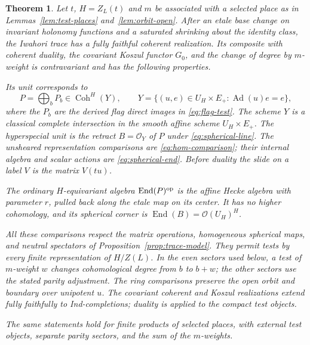 \documentclass[11pt]{article}
\numberwithin{equation}{section}
\newtheorem{theorem}{Theorem}[section]
\theoremstyle{definition}
\theoremstyle{remark}
\newcommand{\cO}{\mathcal O}
\newcommand{\Ad}{\operatorname{Ad}}
\newcommand{\End}{\operatorname{End}}
\newcommand{\Coh}{\operatorname{Coh}}
\begin{document}
\begin{theorem}\label{thm:local-test-model}
Let $t$, $H=Z_L(t)$ and $m$ be associated with a selected place as in
Lemmas~\ref{lem:test-places} and~\ref{lem:orbit-open}.
After an etale base change on invariant holonomy functions and a
saturated shrinking about the identity class, the Iwahori trace has a
fully faithful coherent realization.  Its composite with coherent
duality, the covariant Koszul functor $G_0$, and the change of degree
by $m$-weight is contravariant and has the following properties.

Its unit corresponds to
\[
 P=\bigoplus_bP_b\in\Coh^H(Y),\qquad
 Y=\{(u,e)\in U_H\times E_+:\Ad(u)e=e\},
\]
where the $P_b$ are the derived flag direct images in
\eqref{eq:flag-test}.  The scheme $Y$ is a classical complete
intersection in the smooth affine scheme $U_H\times E_+$.
The hyperspecial unit is the retract $B=\cO_Y$ of $P$ under
\eqref{eq:spherical-line}.  The unsheared representation comparisons
are \eqref{eq:hom-comparison}; their internal algebra and scalar
actions are \eqref{eq:spherical-end}.  Before duality the slide on a
label $V$ is the matrix $V(tu)$.

The ordinary $H$-equivariant algebra $\End(P)^{\rm op}$ is the affine
Hecke algebra with parameter $r$, pulled back along the etale map on
its center.  It has no higher cohomology, and its spherical corner is
$\End(B)=\cO(U_H)^H$.

All these comparisons respect the matrix operations, homogeneous
spherical maps, and neutral spectators of
Proposition~\ref{prop:trace-model}.  They permit tests by every
finite representation of $H/Z(L)$.  In the even sectors used below,
a test of $m$-weight $w$ changes cohomological degree from $b$ to
$b+w$; the other sectors use the stated parity adjustment.  The ring comparisons
preserve the open orbit and boundary over unipotent $u$.  The covariant
coherent and Koszul realizations extend fully faithfully to
Ind-completions; duality is applied to the compact test objects.

The same statements hold for finite products of selected places, with
external test objects, separate parity sectors, and the sum of the
$m$-weights.
\end{theorem}
\end{document}
